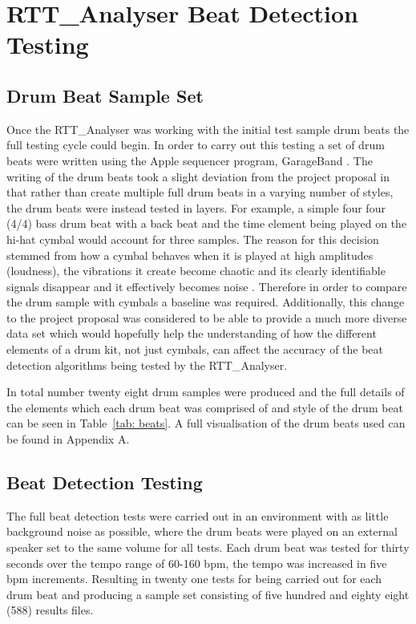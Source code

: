 \documentclass[a4paper, 11pt]{article}
\begin{document}
\maketitle{}\section{RTT\_Analyser Beat Detection Testing}
\subsection{Drum Beat Sample Set}
Once the RTT\_Analyser was working with the initial test sample drum beats the full testing cycle could begin. In order to carry out this testing a set of drum beats were written using the Apple sequencer program, GarageBand \cite{garage}. The writing of the drum beats took a slight deviation from the project proposal in that rather than create multiple full drum beats in a varying number of styles, the drum beats were instead tested in layers. For example, a simple four four (4/4) bass drum beat with a back beat and the time element being played on the hi-hat cymbal would account for three samples. The reason for this decision stemmed from how a cymbal behaves when it is played at high amplitudes (loudness), the vibrations it create become chaotic and its clearly identifiable signals disappear and it effectively becomes noise \cite{soundonsound}. Therefore in order to compare the drum sample with cymbals a baseline was required. Additionally, this change to the project proposal was considered to be able to provide a much more diverse data set which would hopefully help the understanding of how the different elements of a drum kit, not just cymbals, can affect the accuracy of the beat detection algorithms being tested by the RTT\_Analyser.\par

In total number twenty eight drum samples were produced and the full details of the elements which each drum beat was comprised of and style of the drum beat can be seen in Table~\ref{tab: beats}. A full visualisation of the drum beats used can be found in Appendix A.

\subsection{Beat Detection Testing}
The full beat detection tests were carried out in an environment with as little background noise as possible, where the drum beats were played on an external speaker set to the same volume for all tests. Each drum beat was tested for thirty seconds over the tempo range of 60-160 bpm, the tempo was increased in five bpm increments. Resulting in twenty one tests for being carried out for each drum beat and producing a sample set consisting of five hundred and eighty eight (588) results files.
\end{document}
